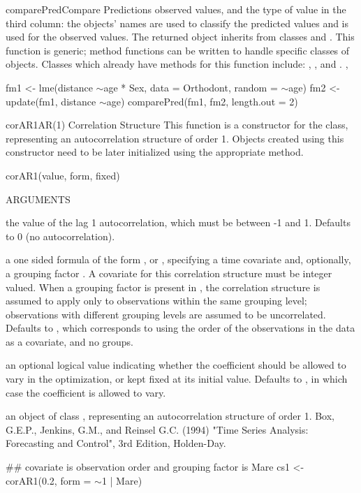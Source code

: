 \documentclass[pdftex]{article} \usepackage{url,graphicx}
\renewcommand{\Twiddle}{\mbox{\(\sim\)}}
\begin{document}
\begin{Helpfile}{comparePred}{Compare Predictions}
observed values, and the type of value in the third column: the
objects' names are used to classify the predicted values and
 is used for the observed values. The returned object
inherits from classes  and .
 This function is generic; method functions can be written to handle
specific classes of objects. Classes which already have methods for
this function include: , , and .
, 
\need 15pt
\vspace{-16pt} 
\begin{Example}
fm1 <- lme(distance \Twiddle age * Sex, data = Orthodont, random = \Twiddle age)
fm2 <- update(fm1, distance \Twiddle age)
comparePred(fm1, fm2, length.out = 2)
\end{Example}
\end{Helpfile}
\begin{Helpfile}{corAR1}{AR(1) Correlation Structure}
This function is a constructor for the  class,
representing an autocorrelation structure of order 1. Objects
created using this constructor need to be later initialized using the
appropriate  method.
\begin{Example}
corAR1(value, form, fixed)
\end{Example}
\begin{Argument}{ARGUMENTS}
\item[\Co{value:}]
the value of the lag 1 autocorrelation, which must be
between -1 and 1. Defaults to 0 (no autocorrelation).
\item[\Co{form:}]
a one sided formula of the form \Co{\Twiddle t}, or \Co{\Twiddle t |
g}, specifying a time covariate  and,  optionally, a
grouping factor . A covariate for this correlation structure
must be integer valued. When a grouping factor is present in
, the correlation structure is assumed to apply only
to observations within the same grouping level; observations with
different grouping levels are assumed to be uncorrelated. Defaults to
\Co{\Twiddle 1}, which corresponds to using the order of the observations
in the data as a covariate, and no groups.
\item[\Co{fixed:}]
an optional logical value indicating whether the
coefficient should be allowed to vary in the optimization, or kept
fixed at its initial value. Defaults to , in which case
the coefficient is allowed to vary.
\end{Argument}
an object of class , representing an autocorrelation
structure of order 1.
Box, G.E.P., Jenkins, G.M., and Reinsel G.C. (1994) "Time Series
Analysis: Forecasting and Control", 3rd Edition, Holden-Day.
\need 15pt
\vspace{-16pt} 
\begin{Example}
## covariate is observation order and grouping factor is Mare
cs1 <- corAR1(0.2, form = \Twiddle 1 | Mare)
\end{Example}
\end{Helpfile}
\end{document}
